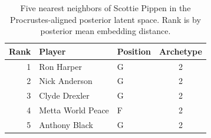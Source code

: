 \begin{table}[htbp]
  \centering\small
  \begin{tabular}{rllc}
    \toprule
    Rank & Player & Position & Archetype \\
    \midrule
    1 & Ron Harper & G & 2 \\
    2 & Nick Anderson & G & 2 \\
    3 & Clyde Drexler & G & 2 \\
    4 & Metta World Peace & F & 2 \\
    5 & Anthony Black & G & 2 \\
    \bottomrule
  \end{tabular}
  \caption{Five nearest neighbors of Scottie Pippen in the Procrustes-aligned posterior latent space. Rank is by posterior mean embedding distance.}
  \label{tab:Scottie_Pippen_neighbors}
\end{table}


